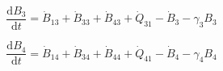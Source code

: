\documentclass[authoryear,preprint,review,12pt]{elsarticle}
\begin{document}
\begin{equation} \label{eq:C-embodied_acct_3_depreciation}
	\frac{\mathrm{d}B_{3}}{\mathrm{d}t} 	 = \dot{B}_{13} + \dot{B}_{33} + \dot{B}_{43} + \dot{Q}_{31} - \dot{B}_{3} - \gamma_3 B_3
\end{equation}

\begin{equation} \label{eq:C-embodied_acct_4_depreciation}
	\frac{\mathrm{d}B_{4}}{\mathrm{d}t}	 = \dot{B}_{14} + \dot{B}_{34} + \dot{B}_{44} + \dot{Q}_{41} - \dot{B}_{4} - \gamma_4 B_4
\end{equation}

%
%
%
%
%
%
%
%
\end{document}

